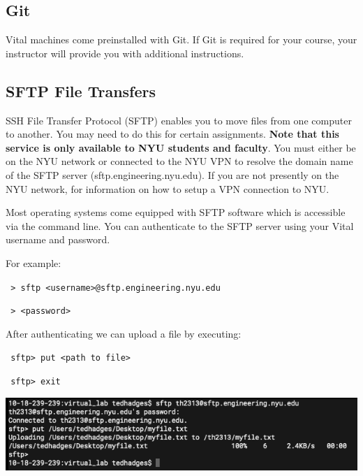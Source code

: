 \documentclass[12pt]{article}
\newcommand{\MYhref}[3][blue]{\href{#2}{\color{#1}{#3}}}%
\begin{document}
\subsection*{Git}
Vital machines come preinstalled with Git. If Git is required for your course, your instructor will provide you with additional instructions.

\subsection*{SFTP File Transfers}
SSH File Transfer Protocol (SFTP) enables you to move files from one computer to another. You may need to do this for certain assignments. \textbf{Note that this service is only available to NYU students and faculty}. You must either be on the NYU network or connected to the NYU VPN to resolve the domain name of the SFTP server (sftp.engineering.nyu.edu). If you are not presently on the NYU network, \MYhref{https://www.nyu.edu/life/information-technology/getting-started/network-and-connectivity/vpn.html}{click here} for information on how to setup a VPN connection to NYU.

Most operating systems come equipped with SFTP software which is accessible via the command line. You can authenticate to the SFTP server using your Vital username and password.

For example:
\begin{adjustwidth}{2.5em}{0pt}
\texttt{
> sftp <username>@sftp.engineering.nyu.edu
}

\texttt{
> <password>
}
\end{adjustwidth}


After authenticating we can upload a file by executing:
\begin{adjustwidth}{2.5em}{0pt}
\texttt{
sftp> put <path to file>
}

\texttt{
sftp> exit
}
\end{adjustwidth}
{%
\centering
\includegraphics[width=\linewidth]{sftp1.png}

}
\end{document}
